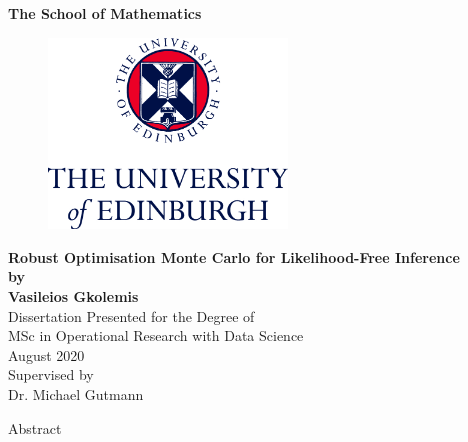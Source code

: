\documentclass[11pt,twoside]{article}
\numberwithin{Theorem}{section}
\numberwithin{Definition}{section}
\numberwithin{Lemma}{section}
\numberwithin{Algorithm}{section}
\numberwithin{equation}{section}
\begin{document}
\pagestyle{empty}

\begin{titlepage}
\vspace*{.5em}
\center
\textbf{\large{The School of Mathematics}} \\
\vspace*{1em}
\begin{figure}[!h]
\centering
\includegraphics[width=180pt]{Thesis/images/CentredLogoCMYK.jpg}
\end{figure}
\vspace{2em}
\textbf{\Huge{Robust Optimisation Monte Carlo for Likelihood-Free Inference}}\\[2em]
\textbf{\LARGE{by}}\\
\vspace{2em}
\textbf{\LARGE{Vasileios Gkolemis}}\\
\vspace{6.5em}
\Large{Dissertation Presented for the Degree of\\
MSc in Operational Research with Data Science}\\
\vspace{6.5em}
\Large{August 2020}\\
\vspace{3em}
\Large{Supervised by\\Dr. Michael Gutmann}
\vfill
\end{titlepage}

\cleardoublepage

\begin{center}
\Large{Abstract}
\end{center}


\clearpage
\end{document}
